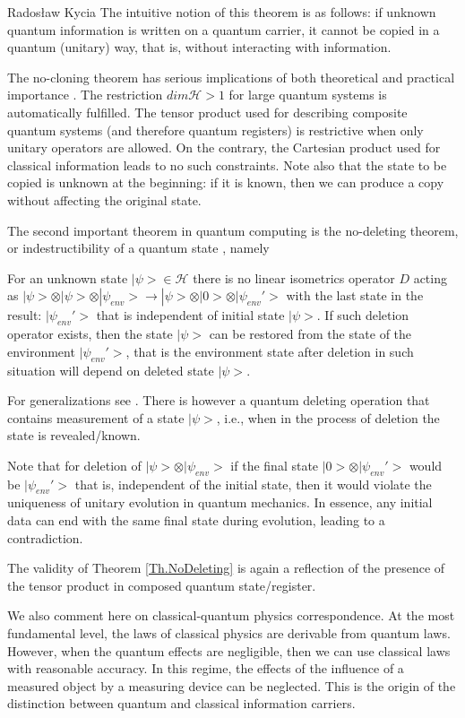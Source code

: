 \begin{artengenv}{Radosław Kycia}
The intuitive notion of this theorem is as follows: if unknown quantum information is written on a quantum carrier, it cannot be copied in a quantum (unitary) way, that is, without interacting with information.

The no-cloning theorem has serious implications of both theoretical and practical importance  \parencite{QuantumComputing}. The restriction $dim\mathcal{H}>1$ for large quantum systems is automatically fulfilled. The tensor product used for describing composite quantum systems (and therefore quantum registers) is restrictive when only unitary operators are allowed. On the contrary, the Cartesian product used for classical information leads to no such constraints. Note also that the state to be copied is unknown at the beginning: if it is known, then we can produce a copy without affecting the original state.

The second important theorem in quantum computing is the no-deleting theorem, or indestructibility of a quantum state \parencite{NoDeleting_PatiBraunstein}, namely
\begin{Theorem}
\label{Th.NoDeleting}
 For an unknown state $|\psi> \in \mathcal{H}$ there is no linear isometrics operator $D$ acting as $|\psi>\otimes |\psi> \otimes |\psi_{env}> \rightarrow |\psi>\otimes |0> \otimes|\psi_{env}'>$ with the last state in the result: $|\psi_{env}'>$ that is independent of initial state $|\psi>$. If such deletion operator exists, then the state $|\psi>$ can be restored from the state of the environment $|\psi_{env}'>$, that is the environment state after deletion in such situation will depend on deleted state $|\psi>$.
\end{Theorem}
For generalizations see \parencite{NoDeleting_PatiBraunstein2}. There is however a quantum deleting operation that contains measurement of a state $|\psi>$, i.e., when in the process of deletion the state is revealed/known.

Note that for deletion of $|\psi>\otimes |\psi_{env}>$ if the final state $|0>\otimes |\psi_{env}'>$ would be $|\psi_{env}'>$ that is, independent of the initial state, then it would violate the uniqueness of unitary evolution in quantum mechanics. In essence, any initial data can end with the same final state during evolution, leading to a contradiction. 

The validity of Theorem \ref{Th.NoDeleting} is again a reflection of the presence of the tensor product in composed quantum state/register.


We also comment here on classical-quantum physics correspondence. At the most fundamental level, the laws of classical physics are derivable from quantum laws. However, when the quantum effects are negligible, then we can use classical laws with reasonable accuracy. In this regime, the effects of the influence of a measured object by a measuring device can be neglected. This is the origin of the distinction between quantum and classical information carriers.



\end{artengenv}
